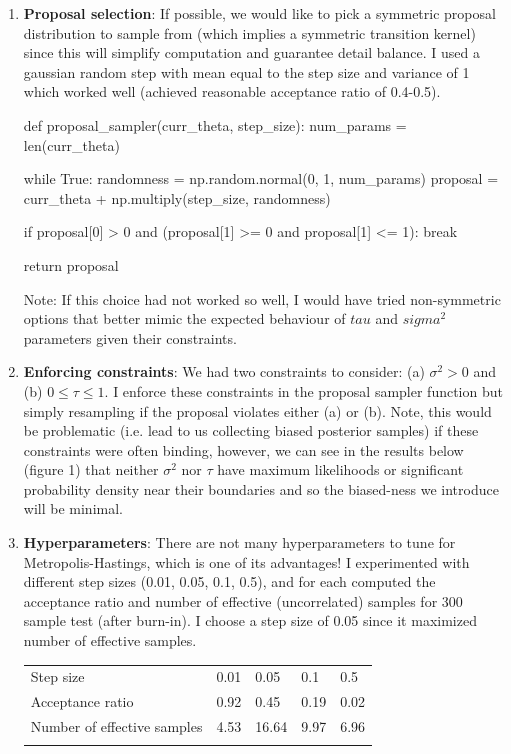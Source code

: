 \documentclass[12pt,letterpaper,twoside]{article}
\begin{document}
\begin{enumerate}[label=(\alph*)]
\item \textbf{Proposal selection}: If possible, we would like to pick a symmetric 
proposal distribution to sample from (which implies a symmetric transition 
kernel) since this will simplify computation and guarantee detail balance. 
I used a gaussian random step with mean equal to the step size and variance 
of 1 which worked well (achieved reasonable acceptance ratio of 0.4-0.5).

\begin{python}
    def proposal_sampler(curr_theta, step_size):
    num_params = len(curr_theta)

    while True:
        randomness = np.random.normal(0, 1, num_params)
        proposal = curr_theta + np.multiply(step_size, randomness)

        if proposal[0] > 0 and (proposal[1] >= 0 and proposal[1] <= 1):
            break

    return proposal
\end{python}

Note: If this choice had not worked so well, I would have tried non-symmetric 
options that better mimic the expected behaviour of $tau$ and $sigma^2$ parameters
given their constraints.

\item \textbf{Enforcing constraints}: We had two constraints to consider: (a) $\sigma^2 > 0$ 
and (b) $0 \le \tau \le 1$. I enforce these constraints in the proposal sampler function 
but simply resampling if the proposal violates either (a) or (b). Note, this would be 
problematic (i.e. lead to us collecting biased posterior samples) if these constraints were 
often binding, however, we can see in the results below (figure 1) that neither $\sigma^2$ 
nor $\tau$ have maximum likelihoods or significant probability density near their boundaries 
and so the biased-ness we introduce will be minimal. 

\item \textbf{Hyperparameters}: There are not many hyperparameters to 
tune for Metropolis-Hastings, which is one of its advantages! I 
experimented with different step sizes (0.01, 0.05, 0.1, 0.5), 
and for each computed the acceptance ratio and number of 
effective (uncorrelated) samples for 300 sample test (after 
burn-in). I choose a step size of 0.05 since it maximized 
number of effective samples.

\begin{table}[h]
    \centering
    \begin{tabular}{lllll}
        Step size                   & 0.01 & 0.05  & 0.1   & 0.5   \\
        Acceptance ratio            & 0.92 & 0.45  & 0.19  & 0.02  \\
        Number of effective samples & 4.53 & 16.64 & 9.97  & 6.96  \\
                                    &      &       &       &         
    \end{tabular}
\end{table}


\end{enumerate}
\end{document}
